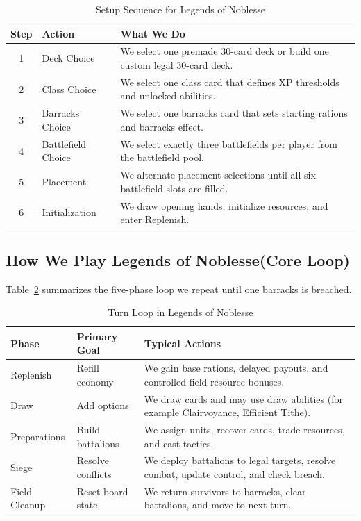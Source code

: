 \documentclass[12pt]{article}
\newcommand{\GameName}{Legends of Noblesse}
\begin{document}
\begin{table}[H]
\centering
\caption{Setup Sequence for \GameName}
\label{tab:setup-sequence}
\begin{tabular}{|c|p{3.2cm}|p{8.3cm}|}
\hline
\textbf{Step} & \textbf{Action} & \textbf{What We Do} \\
\hline
1 & Deck Choice & We select one premade 30-card deck or build one custom legal 30-card deck. \\
\hline
2 & Class Choice & We select one class card that defines XP thresholds and unlocked abilities. \\
\hline
3 & Barracks Choice & We select one barracks card that sets starting rations and barracks effect. \\
\hline
4 & Battlefield Choice & We select exactly three battlefields per player from the battlefield pool. \\
\hline
5 & Placement & We alternate placement selections until all six battlefield slots are filled. \\
\hline
6 & Initialization & We draw opening hands, initialize resources, and enter Replenish. \\
\hline
\end{tabular}
\end{table}

\subsection{How We Play \GameName (Core Loop)}
Table~\ref{tab:phase-loop} summarizes the five-phase loop we repeat until one barracks is breached.

\begin{table}[H]
\centering
\caption{Turn Loop in \GameName}
\label{tab:phase-loop}
\begin{tabular}{|p{2.5cm}|p{3.2cm}|p{7.3cm}|}
\hline
\textbf{Phase} & \textbf{Primary Goal} & \textbf{Typical Actions} \\
\hline
Replenish & Refill economy & We gain base rations, delayed payouts, and controlled-field resource bonuses. \\
\hline
Draw & Add options & We draw cards and may use draw abilities (for example Clairvoyance, Efficient Tithe). \\
\hline
Preparations & Build battalions & We assign units, recover cards, trade resources, and cast tactics. \\
\hline
Siege & Resolve conflicts & We deploy battalions to legal targets, resolve combat, update control, and check breach. \\
\hline
Field Cleanup & Reset board state & We return survivors to barracks, clear battalions, and move to next turn. \\
\hline
\end{tabular}
\end{table}
\end{document}
